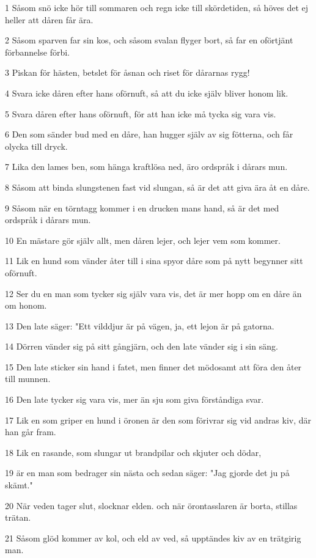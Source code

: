 \par 1 Såsom snö icke hör till sommaren och regn icke till skördetiden, så höves det ej heller att dåren får ära.
\par 2 Såsom sparven far sin kos, och såsom svalan flyger bort, så far en oförtjänt förbannelse förbi.
\par 3 Piskan för hästen, betslet för åsnan och riset för dårarnas rygg!
\par 4 Svara icke dåren efter hans oförnuft, så att du icke själv bliver honom lik.
\par 5 Svara dåren efter hans oförnuft, för att han icke må tycka sig vara vis.
\par 6 Den som sänder bud med en dåre, han hugger själv av sig fötterna, och får olycka till dryck.
\par 7 Lika den lames ben, som hänga kraftlösa ned, äro ordspråk i dårars mun.
\par 8 Såsom att binda slungstenen fast vid slungan, så är det att giva ära åt en dåre.
\par 9 Såsom när en törntagg kommer i en drucken mans hand, så är det med ordspråk i dårars mun.
\par 10 En mästare gör själv allt, men dåren lejer, och lejer vem som kommer.
\par 11 Lik en hund som vänder åter till i sina spyor dåre som på nytt begynner sitt oförnuft.
\par 12 Ser du en man som tycker sig själv vara vis, det är mer hopp om en dåre än om honom.
\par 13 Den late säger: "Ett vilddjur är på vägen, ja, ett lejon är på gatorna.
\par 14 Dörren vänder sig på sitt gångjärn, och den late vänder sig i sin säng.
\par 15 Den late sticker sin hand i fatet, men finner det mödosamt att föra den åter till munnen.
\par 16 Den late tycker sig vara vis, mer än sju som giva förståndiga svar.
\par 17 Lik en som griper en hund i öronen är den som förivrar sig vid andras kiv, där han går fram.
\par 18 Lik en rasande, som slungar ut brandpilar och skjuter och dödar,
\par 19 är en man som bedrager sin nästa och sedan säger: "Jag gjorde det ju på skämt."
\par 20 När veden tager slut, slocknar elden. och när örontasslaren är borta, stillas trätan.
\par 21 Såsom glöd kommer av kol, och eld av ved, så upptändes kiv av en trätgirig man.
